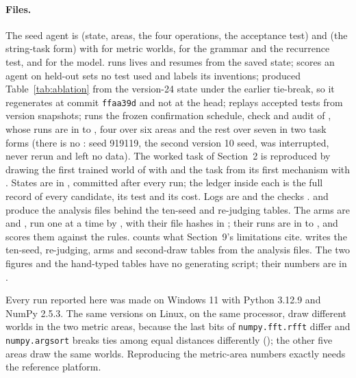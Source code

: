 \documentclass[11pt]{article}
\begin{document}
\paragraph{Files.} The seed agent is  (state, areas, the four operations, the acceptance test) and  (the string-task form) with  for metric worlds,  for the grammar and the recurrence test, and  for the model.  runs lives and resumes from the saved state;  scores an agent on held-out sets no test used and labels its inventions;  produced Table~\ref{tab:ablation} from the version-24 state under the earlier tie-break, so it regenerates at commit \texttt{ffaa39d} and not at the head;  replays accepted tests from version snapshots;  runs the frozen confirmation schedule, check and audit of , whose runs are in  to , four over six areas and the rest over seven in two task forms (there is no : seed 919119, the second version 10 seed, was interrupted, never rerun and left no data). The worked task of Section~2 is reproduced by drawing the first trained world of  with  and the task from its first mechanism with . States are in , committed after every run; the ledger inside each is the full record of every candidate, its test and its cost. Logs are  and the checks .  and  produce the analysis files behind the ten-seed and re-judging tables. The arms are  and , run one at a time by , with their file hashes in ; their runs are in  to , and  scores them against the rules.  counts what Section~9's limitations cite.  writes the ten-seed, re-judging, arms and second-draw tables from the analysis files. The two figures and the hand-typed tables have no generating script; their numbers are in .

Every run reported here was made on Windows 11 with Python 3.12.9 and NumPy 2.5.3. The same versions on Linux, on the same processor, draw different worlds in the two metric areas, because the last bits of \texttt{numpy.fft.rfft} differ and \texttt{numpy.argsort} breaks ties among equal distances differently (); the other five areas draw the same worlds. Reproducing the metric-area numbers exactly needs the reference platform.
\end{document}
